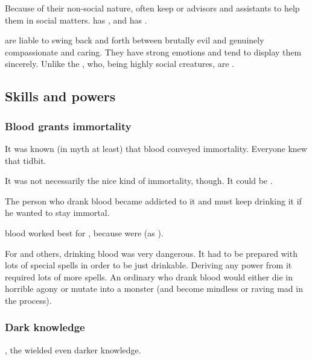 Because of their non-social nature, \dragonlords{} often keep \scathaese{} or  advisors and assistants to help them in social matters. 
\Secherdamon{} has \LocarPsyrex, and \Ishnaruchaefir{} has \Criseis. 

\Dragons{} are liable to swing back and forth between brutally evil and genuinely compassionate and caring. 
They have strong emotions and tend to display them sincerely. 
Unlike the \resphain{}, who, being highly social creatures, are . 










\subsection{Skills and powers}





\subsubsection{Blood grants immortality}
It was known (in myth at least) that \draconian blood conveyed immortality.
Everyone knew that tidbit.

It was not necessarily the nice kind of immortality, though. 
It could be .

The person who drank \draconian blood became addicted to it and must keep drinking it if he wanted to stay immortal. 

\Dragon blood worked best for \scathae, because \scathae were  (as ). 

For \humans and others, drinking \draconian blood was very dangerous.
It had to be prepared with lots of special spells in order to be just drinkable.
Deriving any power from it required lots of more spells. 
An ordinary \human who drank \draconian blood would either die in horrible agony or mutate into a monster (and become mindless or raving mad in the process). 






\subsubsection{Dark knowledge}
, {the \dragons wielded even darker knowledge}. 


